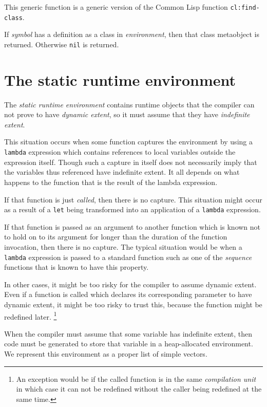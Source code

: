 This generic function is a generic version of the Common Lisp function
\texttt{cl:find-class}.

If \textit{symbol} has a definition as a class in
\textit{environment}, then that class metaobject is returned.
Otherwise \texttt{nil} is returned.

\section{The static runtime environment}
\label{sec-environments-static-runtime}

The \emph{static runtime environment} contains runtime objects that
the compiler can not prove to have \emph{dynamic extent}, so it must
assume that they have \emph{indefinite extent}.  

This situation occurs when some function captures the environment by
using a \texttt{lambda} expression which contains references to local
variables outside the expression itself.  Though such a capture in
itself does not necessarily imply that the variables thus referenced
have indefinite extent.  It all depends on what happens to the
function that is the result of the lambda expression.  

If that function is just \emph{called}, then there is no capture.  This
situation might occur as a result of a \texttt{let} being transformed
into an application of a \texttt{lambda} expression.  

If that function is passed as an argument to another function which is
known not to hold on to its argument for longer than the duration of
the function invocation, then there is no capture.  The typical
situation would be when a \texttt{lambda} expression is passed to a
standard \commonlisp{} function such as one of the \emph{sequence} functions
that is known to have this property.  

In other cases, it might be too risky for the compiler to assume
dynamic extent.  Even if a function is called which declares its
corresponding parameter to have dynamic extent, it might be too risky
to trust this, because the function might be redefined later.%
\footnote{An exception would be if the called function is in the same
  \emph{compilation unit} in which case it can not be redefined
  without the caller being redefined at the same time.}

When the compiler must assume that some variable has indefinite
extent, then code must be generated to store that variable in a
heap-allocated environment.  We represent this environment as a proper
\commonlisp{} list of simple vectors.  

